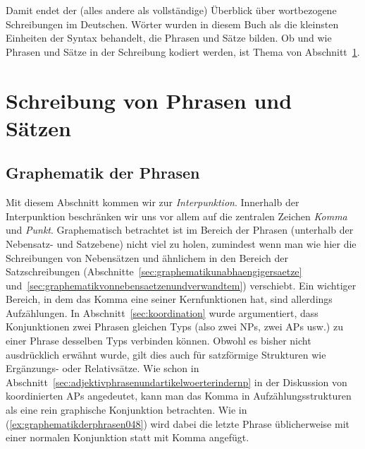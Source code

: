 Damit endet der (alles andere als vollständige) Überblick über wortbezogene Schreibungen im Deutschen.
Wörter wurden in diesem Buch als die kleinsten Einheiten der Syntax behandelt, die Phrasen und Sätze bilden.
Ob und wie Phrasen und Sätze in der Schreibung kodiert werden, ist Thema von Abschnitt~\ref{sec:schreibungvonphrasenundsaetzen}.


\section{Schreibung von Phrasen und Sätzen}
\label{sec:schreibungvonphrasenundsaetzen}

\subsection{Graphematik der Phrasen}
\label{sec:graphematikderphrasen}

Mit diesem Abschnitt kommen wir zur \textit{Interpunktion}.
Innerhalb der Interpunktion beschränken wir uns vor allem auf die zentralen Zeichen \textit{Komma} und \textit{Punkt}.
Graphematisch betrachtet ist im Bereich der Phrasen (unterhalb der Nebensatz- und Satzebene) nicht viel zu holen, zumindest wenn man wie hier die Schreibungen von Nebensätzen und ähnlichem in den Bereich der Satzschreibungen (Abschnitte~\ref{sec:graphematikunabhaengigersaetze} und~\ref{sec:graphematikvonnebensaetzenundverwandtem}) verschiebt.
Ein wichtiger Bereich, in dem das Komma eine seiner Kernfunktionen hat, sind allerdings Aufzählungen.
In Abschnitt~\ref{sec:koordination} wurde argumentiert, dass Konjunktionen zwei Phrasen gleichen Typs (also zwei NPs, zwei APs usw.) zu einer Phrase desselben Typs verbinden können.
Obwohl es bisher nicht ausdrücklich erwähnt wurde, gilt dies auch für satzförmige Strukturen wie Ergänzungs- oder Relativsätze.
Wie schon in Abschnitt~\ref{sec:adjektivphrasenundartikelwoerterindernp} in der Diskussion von koordinierten APs angedeutet, kann man das Komma in Aufzählungsstrukturen als eine rein graphische Konjunktion betrachten.
Wie in (\ref{ex:graphematikderphrasen048}) wird dabei die letzte Phrase üblicherweise mit einer normalen Konjunktion statt mit Komma angefügt.

